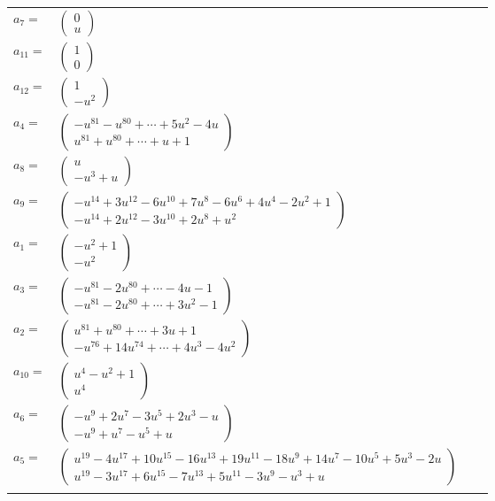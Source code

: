 \documentclass[1p]{elsarticle_modified}
\theoremstyle{definition}
\begin{document}
\begin{tabular}{m{7pt} m{180pt} m{7pt} m{180pt} }
\flushright $a_{7}=$&$\begin{pmatrix}0\\u\end{pmatrix}$ \\
\flushright $a_{11}=$&$\begin{pmatrix}1\\0\end{pmatrix}$ \\
\flushright $a_{12}=$&$\begin{pmatrix}1\\- u^2\end{pmatrix}$ \\
\flushright $a_{4}=$&$\begin{pmatrix}- u^{81}- u^{80}+\cdots+5 u^2-4 u\\u^{81}+u^{80}+\cdots+u+1\end{pmatrix}$ \\
\flushright $a_{8}=$&$\begin{pmatrix}u\\- u^3+u\end{pmatrix}$ \\
\flushright $a_{9}=$&$\begin{pmatrix}- u^{14}+3 u^{12}-6 u^{10}+7 u^8-6 u^6+4 u^4-2 u^2+1\\- u^{14}+2 u^{12}-3 u^{10}+2 u^8+u^2\end{pmatrix}$ \\
\flushright $a_{1}=$&$\begin{pmatrix}- u^2+1\\- u^2\end{pmatrix}$ \\
\flushright $a_{3}=$&$\begin{pmatrix}- u^{81}-2 u^{80}+\cdots-4 u-1\\- u^{81}-2 u^{80}+\cdots+3 u^2-1\end{pmatrix}$ \\
\flushright $a_{2}=$&$\begin{pmatrix}u^{81}+u^{80}+\cdots+3 u+1\\- u^{76}+14 u^{74}+\cdots+4 u^3-4 u^2\end{pmatrix}$ \\
\flushright $a_{10}=$&$\begin{pmatrix}u^4- u^2+1\\u^4\end{pmatrix}$ \\
\flushright $a_{6}=$&$\begin{pmatrix}- u^9+2 u^7-3 u^5+2 u^3- u\\- u^9+u^7- u^5+u\end{pmatrix}$ \\
\flushright $a_{5}=$&$\begin{pmatrix}u^{19}-4 u^{17}+10 u^{15}-16 u^{13}+19 u^{11}-18 u^9+14 u^7-10 u^5+5 u^3-2 u\\u^{19}-3 u^{17}+6 u^{15}-7 u^{13}+5 u^{11}-3 u^9- u^3+u\end{pmatrix}$\\&\end{tabular}
\end{document}
